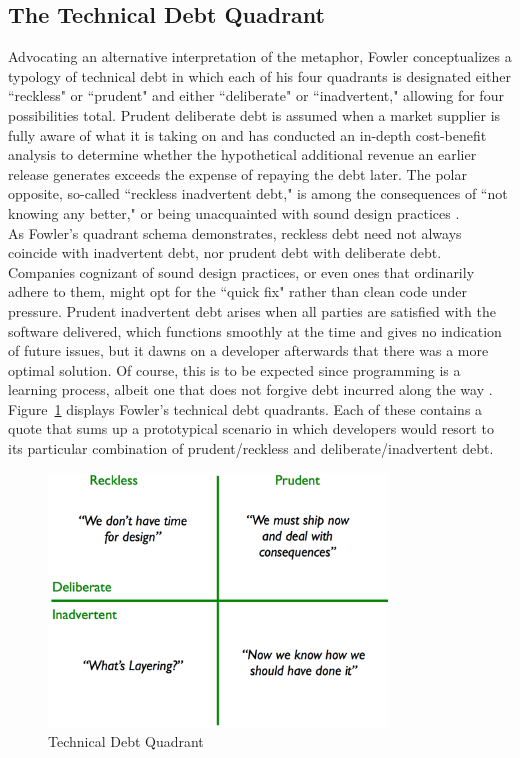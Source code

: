 

\subsection{The Technical Debt Quadrant}

Advocating an alternative interpretation of the metaphor, Fowler \cite{fowler} conceptualizes a typology of technical debt in which each of his four quadrants is designated either ``reckless" or ``prudent" and either ``deliberate" or ``inadvertent," allowing for four possibilities total. Prudent deliberate debt is assumed when a market supplier is fully aware of what it is taking on and has conducted an in-depth cost-benefit analysis to determine whether the hypothetical additional revenue an earlier release generates exceeds the expense of repaying the debt later. The polar opposite, so-called ``reckless inadvertent debt," is among the consequences of ``not knowing any better," or being unacquainted with sound design practices \cite{fowler}.\\
As Fowler's quadrant schema demonstrates, reckless debt need not always coincide with inadvertent debt, nor prudent debt with deliberate debt. Companies cognizant of sound design practices, or even ones that ordinarily adhere to them, might opt for the ``quick fix" rather than clean code under pressure. Prudent inadvertent debt arises when all parties are satisfied with the software delivered, which functions smoothly at the time and gives no indication of future issues, but it dawns on a developer afterwards that there was a more optimal solution. Of course, this is to be expected since programming is a learning process, albeit one that does not forgive debt incurred along the way \cite{fowler}.\\
Figure~\ref{fig:technical_debt_quadrant} displays Fowler's technical debt quadrants. Each of these contains a quote that sums up a prototypical scenario in which developers would resort to its particular combination of prudent/reckless and deliberate/inadvertent debt.\\

\begin{figure}[th]
	\centering
	\includegraphics[width=90mm]{figures/chapter2/technicalDebtQuadrant}
	\caption{Technical Debt Quadrant}
	\label{fig:technical_debt_quadrant}
\end{figure}

